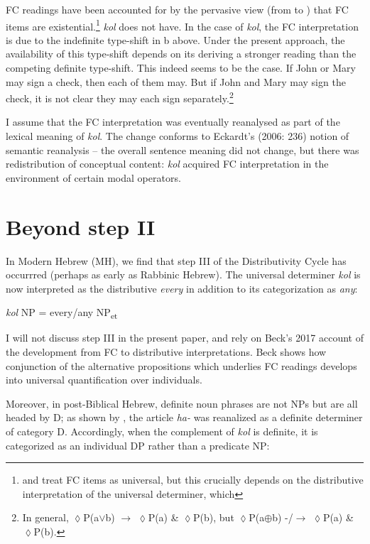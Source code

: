 \documentclass[output=paper]{langsci/langscibook}
\begin{document}
FC readings have been accounted for by the pervasive view (from \citealt{KadmonLandman1993} to \citealt{Chierchia2013}) that FC items are existential.\footnote{\citealt{Benito2010} and \citealt{Zimmermann2008} treat FC items as universal, but this crucially depends on the distributive interpretation of the universal determiner, which} \textrm{\textit{kol}} \textrm{does not have.} In the case of \textit{kol}, the FC interpretation is due to the indefinite type-shift in  b above. Under the present approach, the availability of this type-shift depends on its deriving a stronger reading than the competing definite type-shift. This indeed seems to be the case. If John or Mary may sign a check, then each of them may. But if John and Mary may sign the check, it is not clear they may each sign separately.\footnote{ \textrm{In general, ${\lozenge}$P(a${\vee}$b) ${\rightarrow}$  ${\lozenge}$P(a) \& ${\lozenge}$P(b), but  ${\lozenge}$P(a${\oplus}$}b) -/\textrm{${\rightarrow}$} ${\lozenge}$P(a) \& ${\lozenge}$P(b).}

I assume that the FC interpretation was eventually reanalysed as part of the lexical meaning of \textit{kol}. The change conforms to Eckardt’s (2006: 236) notion of semantic reanalysis – the overall sentence meaning did not change, but there was redistribution of conceptual content: \textit{kol} acquired FC interpretation in the environment of certain modal operators.

\section{Beyond step II}%

In Modern Hebrew (MH), we find that step III of the Distributivity Cycle has occurrred (perhaps as early as Rabbinic Hebrew). The universal determiner \textit{kol} is now interpreted as the distributive \textit{every} in addition to its categorization as \textit{any}:

\ea%
    \label{ex:doron:56}
    \textit{kol} NP  =  every/any   NP\textsubscript{et} 
\z

I will not discuss step III in the present paper, and rely on Beck’s 2017 account of the development from FC to distributive interpretations. Beck shows how conjunction of the alternative propositions which underlies FC readings develops into universal quantification over individuals.

Moreover, in post-Biblical Hebrew, definite noun phrases are not NPs but are all headed by D; as shown by \citealt{DoronMeir2016}, the article \textit{ha-} was reanalized as a definite determiner of category D. Accordingly, when the complement of \textit{kol} is definite, it is categorized as an individual DP rather than a predicate NP:
\end{document}
